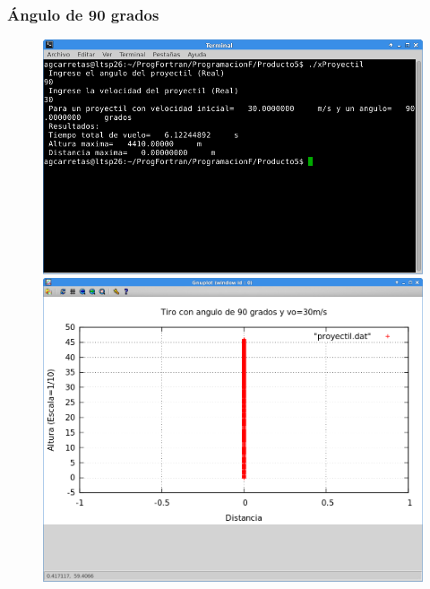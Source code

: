 \documentclass[a4paper]{article}
\begin{document}
\subsubsection{Ángulo de 90 grados}
\begin{figure}[H]
    \centering
    \includegraphics[width=12cm]{90} \\
    \includegraphics[width=12cm]{90plot}
  \end{figure} 
\end{document}
